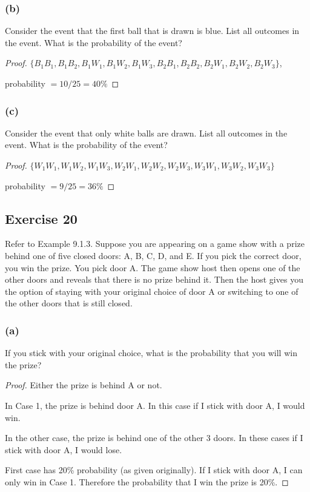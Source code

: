 \documentclass[14pt]{extarticle}
\begin{document}
\subsubsection{(b)}
Consider the event that the first ball that is drawn is blue. List all outcomes in the event.
What is the probability of the event?

\begin{proof}
     \(\{B_1B_1, B_1B_2, B_1W_1, B_1W_2, B_1W_3, B_2B_1, B_2B_2, B_2W_1, B_2W_2, B_2W_3\}\),

     probability \(= 10/25 = 40\%\)
\end{proof}

\subsubsection{(c)}
Consider the event that only white balls are drawn. List all outcomes in the event.
What is the probability of the event?

\begin{proof}
     \(\{W_1W_1, W_1W_2, W_1W_3, W_2W_1, W_2W_2, W_2W_3, W_3W_1, W_3W_2, W_3W_3\}\)

     probability \(= 9/25 = 36\%\)
\end{proof}

\subsection{Exercise 20}
Refer to Example 9.1.3. Suppose you are appearing on a game show with a prize behind one of five closed doors: A, B, C,
D, and E. If you pick the correct door, you win the prize. You pick door A. The game show host then opens one of the
other doors and reveals that there is no prize behind it. Then the host gives you the option of staying with your
original choice of door A or switching to one of the other doors that is still closed.

\subsubsection{(a)}
If you stick with your original choice, what is the probability that you will win the prize?

\begin{proof}
     Either the prize is behind A or not.

     In Case 1, the prize is behind door A. In this case if I stick with door A, I would win.

     In the other case, the prize is behind one of the other 3 doors. In these cases if I stick with door A, I would lose.

     First case has 20\% probability (as given originally). If I stick with door A, I can only win in Case 1. Therefore the probability that I win the prize is 20\%.
\end{proof}
\end{document}
